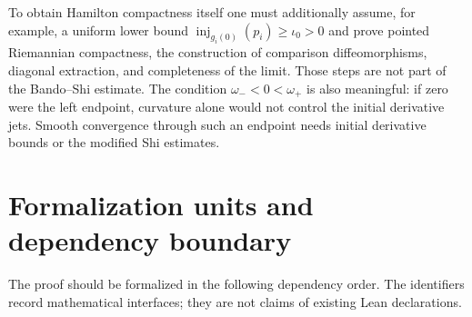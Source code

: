 \documentclass[10pt]{coll-l}
\newcommand{\inj}{\operatorname{inj}}
\theoremstyle{definition}
\theoremstyle{remark}
\numberwithin{section}{chapter}
\numberwithin{equation}{chapter}
\begin{document}
To obtain Hamilton compactness itself one must additionally assume, for
example, a uniform lower bound
$\inj_{g_i(0)}(p_i)\geq\iota_0>0$ and prove pointed Riemannian compactness,
the construction of comparison diffeomorphisms, diagonal extraction, and
completeness of the limit.  Those steps are not part of the Bando--Shi
estimate.  The condition $\omega_-<0<\omega_+$ is also meaningful: if zero
were the left endpoint, curvature alone would not control the initial
derivative jets.  Smooth convergence through such an endpoint needs initial
derivative bounds or the modified Shi estimates.

\section{Formalization units and dependency boundary}
\label{sec:shi-formalization}

The proof should be formalized in the following dependency order.  The
identifiers record mathematical interfaces; they are not claims of existing
Lean declarations.
\end{document}
